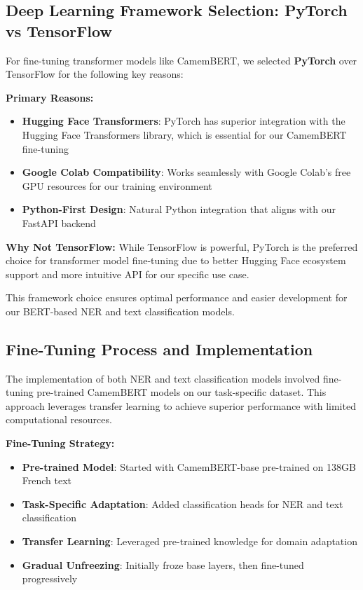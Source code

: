 \documentclass[12pt,a4paper]{article}
\begin{document}
\subsection{Deep Learning Framework Selection: PyTorch vs TensorFlow}

For fine-tuning transformer models like CamemBERT, we selected \textbf{PyTorch} over TensorFlow for the following key reasons:

\textbf{Primary Reasons:}
\begin{itemize}
    \item \textbf{Hugging Face Transformers}: PyTorch has superior integration with the Hugging Face Transformers library, which is essential for our CamemBERT fine-tuning
    \item \textbf{Google Colab Compatibility}: Works seamlessly with Google Colab's free GPU resources for our training environment
    \item \textbf{Python-First Design}: Natural Python integration that aligns with our FastAPI backend
\end{itemize}

\textbf{Why Not TensorFlow:}
While TensorFlow is powerful, PyTorch is the preferred choice for transformer model fine-tuning due to better Hugging Face ecosystem support and more intuitive API for our specific use case.

This framework choice ensures optimal performance and easier development for our BERT-based NER and text classification models.


\subsection{Fine-Tuning Process and Implementation}

The implementation of both NER and text classification models involved fine-tuning pre-trained CamemBERT models on our task-specific dataset. This approach leverages transfer learning to achieve superior performance with limited computational resources.

\textbf{Fine-Tuning Strategy:}
\begin{itemize}
    \item \textbf{Pre-trained Model}: Started with CamemBERT-base pre-trained on 138GB French text
    \item \textbf{Task-Specific Adaptation}: Added classification heads for NER and text classification
    \item \textbf{Transfer Learning}: Leveraged pre-trained knowledge for domain adaptation
    \item \textbf{Gradual Unfreezing}: Initially froze base layers, then fine-tuned progressively
\end{itemize}
\end{document}

